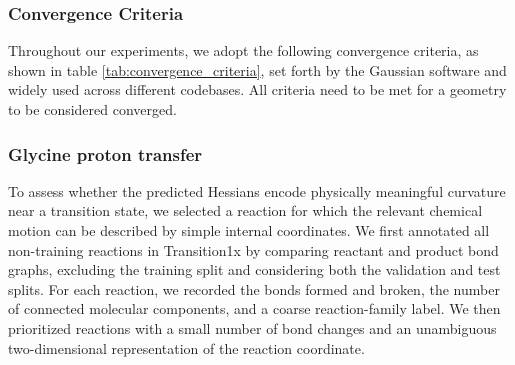 \documentclass[pdflatex,sn-mathphys-num]{sn-jnl}%
\theoremstyle{thmstyleone}%
\theoremstyle{thmstyletwo}%
\theoremstyle{thmstylethree}%
\begin{document}
\begin{appendices}
\subsubsection{Convergence Criteria\label{sec:convergence}}
Throughout our experiments, we adopt the following convergence criteria, as shown in table \ref{tab:convergence_criteria}, set forth by the Gaussian software and widely used across different codebases.
All criteria need to be met for a geometry to be considered converged.

\begin{table}
\centering
{}
\caption{Convergence criteria used in our experiments}
\label{tab:convergence_criteria}
\end{table}



\subsubsection{Glycine proton transfer\label{sec:glycinedetails}}

To assess whether the predicted Hessians encode physically meaningful curvature near a transition state, we selected a reaction for which the relevant chemical motion can be described by simple internal coordinates. We first annotated all non-training reactions in Transition1x by comparing reactant and product bond graphs, excluding the training split and considering both the validation and test splits. For each reaction, we recorded the bonds formed and broken, the number of connected molecular components, and a coarse reaction-family label. We then prioritized reactions with a small number of bond changes and an unambiguous two-dimensional representation of the reaction coordinate.


\end{appendices}
\end{document}
